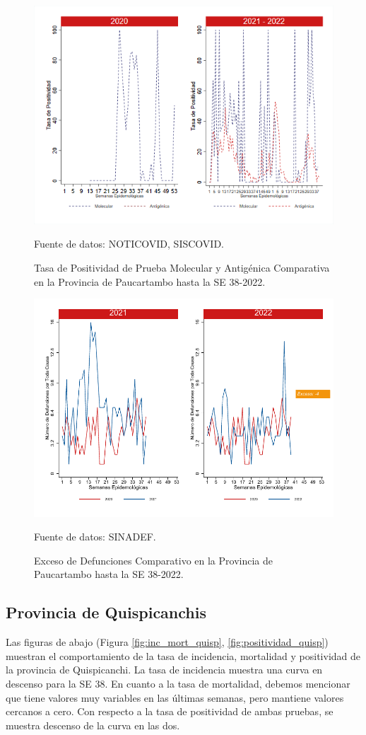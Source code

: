\documentclass[12pt,a4paper,openany]{book}
\begin{document}
	\begin{figure}[h]
		\caption{Tasa de Positividad de Prueba Molecular y Antigénica Comparativa en la Provincia de Paucartambo hasta la SE 38-2022.}\label{fig:positividad_paucartam}
		\begin{center}
			\includegraphics[width=0.7\linewidth]{../figuras/positividad_20_21_11.png}
		\end{center}
		{\footnotesize {Fuente de datos: NOTICOVID, SISCOVID.}}
	\end{figure}
	
	\begin{figure}[h]
		\caption{Exceso de Defunciones Comparativo en la Provincia de Paucartambo hasta la SE 38-2022.}\label{fig:exceso_paucartam}
		\begin{center}
			\includegraphics[width=0.7\linewidth]{../figuras/exceso_11.pdf}
		\end{center}
		{\footnotesize {Fuente de datos: SINADEF.}}
	\end{figure}
	
	\clearpage
	
	\subsection*{Provincia de Quispicanchis}
	\noindent Las figuras de abajo (Figura \ref{fig:inc_mort_quisp}, \ref{fig:positividad_quisp}) muestran el comportamiento de la tasa de incidencia, mortalidad y positividad de la provincia de Quispicanchi. La tasa de incidencia muestra una curva en descenso para la SE 38. En cuanto a la tasa de mortalidad, debemos mencionar que tiene valores muy variables en las últimas semanas, pero mantiene valores cercanos a cero. Con respecto a la tasa de positividad de ambas pruebas, se muestra descenso de la curva en las dos.
	
\end{document}
